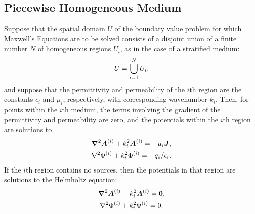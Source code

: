 \subsection{Piecewise Homogeneous Medium}
Suppose that the spatial domain $U$ of the boundary value problem
for which Maxwell's Equations are to be
solved consists of a disjoint union of a finite number $N$ of
homogeneous regions $U_i$, as in the case of a stratified medium:
\begin{equation}
  U = \bigcup_{i=1}^{N} U_i,
\end{equation}
and suppose that the permittivity and permeability of the $i$th region
are the constants $\epsilon_i$ and $\mu_i$, respectively, with corresponding
wavenumber $k_i$.  Then, for
points within the $i$th medium, the terms involving the gradient of
the permittivity and permeability are zero, and the 
potentials within the $i$th region are solutions to 
\begin{subequations}
  \begin{gather}
    \boldsymbol{\nabla}^2\boldsymbol{A}^{(i)} + k_i^2 \boldsymbol{A}^{(i)}  = -\mu_i\boldsymbol{J}, \\
    \nabla^2\Phi^{(i)} + k_i^2 \Phi^{(i)}  = -q_{\text{e}}/\epsilon_i.
  \end{gather}
\end{subequations}
If the $i$th region contains no sources, then the potentials
in that region are solutions to the Helmholtz equation:
\begin{subequations}
  \begin{gather}
    \boldsymbol{\nabla}^2\boldsymbol{A}^{(i)} + k_i^2 \boldsymbol{A}^{(i)}  = \boldsymbol{0}, \\
    \nabla^2\Phi^{(i)} + k_i^2 \Phi^{(i)}  = 0.
  \end{gather}
\end{subequations}

